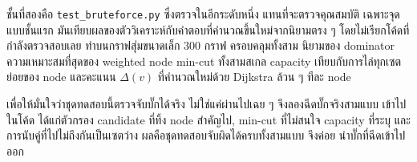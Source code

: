 ชั้นที่สองคือ \texttt{test\_bruteforce.py} ซึ่งตรวจในอีกระดับหนึ่ง แทนที่จะตรวจคุณสมบัติ
เฉพาะจุดแบบชั้นแรก มันเทียบผลของตัววิเคราะห์กับคำตอบที่คำนวณขึ้นใหม่จากนิยามตรง ๆ
โดยไม่เรียกโค้ดที่กำลังตรวจสอบเลย ทำบนกราฟสุ่มขนาดเล็ก 300 กราฟ ครอบคลุมทั้งสาม
นิยามของ dominator ความเหมาะสมที่สุดของ weighted node min-cut ทั้งสามสเกล
capacity เทียบกับการไล่ทุกเซตย่อยของ node และคะแนน $\Delta(v)$ ที่คำนวณใหม่ด้วย
Dijkstra ล้วน ๆ ทีละ node

เพื่อให้มั่นใจว่าชุดทดสอบนี้ตรวจจับบั๊กได้จริง ไม่ใช่แค่ผ่านไปเฉย ๆ จึงลองฉีดบั๊กจริงสามแบบ
เข้าไปในโค้ด ได้แก่ตัวกรอง candidate ที่ทิ้ง node สำคัญไป, min-cut ที่ไม่สนใจ capacity
ที่ระบุ และการนับคู่ที่ไปไม่ถึงกันเป็นเซตว่าง ผลคือชุดทดสอบจับผิดได้ครบทั้งสามแบบ จึงค่อย
นำบั๊กที่ฉีดเข้าไปออก
